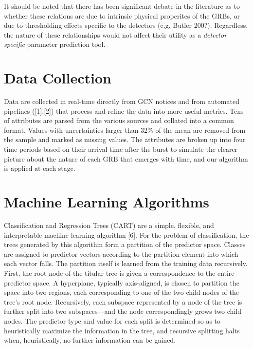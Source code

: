 \documentclass[12pt,preprint]{aastex}
\begin{document}
It should be noted that there has been significant debate in the literature as
to whether these relations are due to intrinsic physical properites of the GRBs,
or due to thresholding effects specific to the detectors (e.g. Butler 200?).  
Regardless, the nature of these relationships would not affect their utility 
as a {\it detector specific} parameter prediction tool.

\section{Data Collection}
\label{sec:obs}
Data are collected in real-time directly from GCN notices and from automated 
pipelines ([1],[2]) that process and refine the data into more useful metrics.  
Tens of attributes are parsed from the various sources and collated into a 
common format.  Values with uncertainties larger than 32\% of the mean are 
removed from the sample and marked as missing values.  The attributes are 
broken up into four time periods based on their arrival time after the burst 
to simulate the clearer picture about the nature of each GRB that emerges with 
time, and our algorithm is applied at each stage.

\section{Machine Learning Algorithms}
\label{sec:models}
Classification and Regression Trees (CART) are a simple, flexible, and 
interpretable machine learning algorithm [6]. For the problem of 
classification, the trees generated by this algorithm form a partition of 
the predictor space. Classes are assigned to predictor vectors according to 
the partition element into which each vector falls. The partition itself is 
learned from the training data recursively. First, the root node of the 
titular tree is given a correspondence to the entire predictor space. A 
hyperplane, typically axis-aligned, is chosen to partition the space into 
two regions, each corresponding to one of the two child nodes of the tree's 
root node. Recursively, each subspace represented by a node of the tree is 
further split into two subspaces---and the node correspondingly grows two 
child nodes. The predictor type and value for each split is determined so 
as to heuristically maximize the information in the tree, and recursive 
splitting halts when, heuristically, no further information can be gained.
\end{document}

